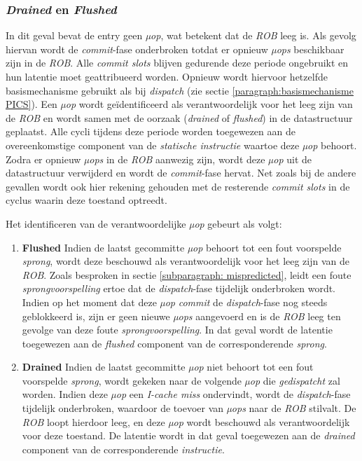 \documentclass[12pt,a4paper,faculty=ea,language=nl]{ugent-doc}
\begin{document}
\subsubsection{\textit{Drained} en \textit{Flushed}}

In dit geval bevat de entry geen \textit{µop}, wat betekent dat de \textit{ROB} leeg is.
Als gevolg hiervan wordt de \textit{commit}-fase onderbroken totdat er opnieuw \textit{µops} beschikbaar zijn in de \textit{ROB}.
Alle \textit{commit slots} blijven gedurende deze periode ongebruikt en hun latentie moet geattribueerd worden.
Opnieuw wordt hiervoor hetzelfde basismechanisme gebruikt als bij \textit{dispatch} (zie sectie \ref{paragraph:basismechanisme PICS}).
Een \textit{µop} wordt geïdentificeerd als verantwoordelijk voor het leeg zijn van de \textit{ROB} en wordt samen met de oorzaak (\textit{drained} of \textit{flushed}) in de datastructuur geplaatst.
Alle cycli tijdens deze periode worden toegewezen aan de overeenkomstige component van de \textit{statische instructie} waartoe deze \textit{µop} behoort.
Zodra er opnieuw \textit{µops} in de \textit{ROB} aanwezig zijn, wordt deze \textit{µop} uit de datastructuur verwijderd en wordt de \textit{commit}-fase hervat.
Net zoals bij de andere gevallen wordt ook hier rekening gehouden met de resterende \textit{commit slots} in de cyclus waarin deze toestand optreedt.

Het identificeren van de verantwoordelijke \textit{µop} gebeurt als volgt:

\begin{enumerate}
    \item{\textbf{Flushed}} Indien de laatst gecommitte \textit{µop} behoort tot een fout voorspelde \textit{sprong}, wordt deze beschouwd als verantwoordelijk voor het leeg zijn van de \textit{ROB}.
                            Zoals besproken in sectie \ref{subparagraph: mispredicted}, leidt een foute \textit{sprongvoorspelling} ertoe dat de \textit{dispatch}-fase tijdelijk onderbroken wordt.
                            Indien op het moment dat deze \textit{µop} \textit{commit} de \textit{dispatch}-fase nog steeds geblokkeerd is, zijn er geen nieuwe \textit{µops} aangevoerd en is de \textit{ROB} leeg ten gevolge van deze foute \textit{sprongvoorspelling}.
                            In dat geval wordt de latentie toegewezen aan de \textit{flushed} component van de corresponderende \textit{sprong}.
    \item{\textbf{Drained}} Indien de laatst gecommitte \textit{µop} niet behoort tot een fout voorspelde \textit{sprong}, wordt gekeken naar de volgende \textit{µop} die \textit{gedispatcht} zal worden.
                            Indien deze \textit{µop} een \textit{I-cache miss} ondervindt, wordt de \textit{dispatch}-fase tijdelijk onderbroken, waardoor de toevoer van \textit{µops} naar de \textit{ROB} stilvalt.
                            De \textit{ROB} loopt hierdoor leeg, en deze \textit{µop} wordt beschouwd als verantwoordelijk voor deze toestand.
                            De latentie wordt in dat geval toegewezen aan de \textit{drained} component van de corresponderende \textit{instructie}.
\end{enumerate}
\end{document}
